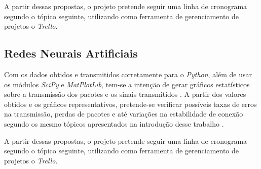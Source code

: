 \documentclass[conference]{IEEEtran}
\begin{document}
A partir dessas propostas, o projeto pretende seguir uma linha de cronograma segundo o t\'opico seguinte, utilizando como ferramenta de gerenciamento de projetos o \textit{Trello}.

\subsection{Redes Neurais Artificiais}
Com os dados obtidos e transmitidos corretamente para o \textit{Python}, al\'em de usar os m\'odulos \textit{SciPy} e \textit{MatPlotLib}, tem-se a inten\c{c}\~ao de gerar gr\'aficos estat\'isticos sobre a transmiss\~ao dos pacotes e os sinais transmitidos \cite{pythonPSV}. A partir dos valores obtidos e os gr\'aficos representativos, pretende-se verificar poss\'iveis taxas de erros na transmiss\~ao, perdas de pacotes e at\'e varia\c{c}\~oes na estabilidade de conex\~ao segundo os mesmo t\'opicos apresentados na introdu\c{c}\~ao desse trabalho \cite{ciscoRfProblems}.

A partir dessas propostas, o projeto pretende seguir uma linha de cronograma segundo o t\'opico seguinte, utilizando como ferramenta de gerenciamento de projetos o \textit{Trello}.

%
%

\end{document}
